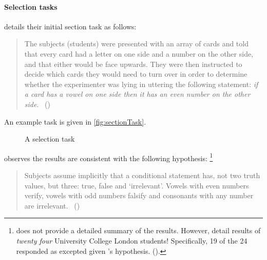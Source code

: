 \paragraph*{Selection tasks}
\nocite{Wason:1968aa}
\nocite{Wason:1971aa}
\label{par:selection-tasks}


\begin{note}
  \citeauthor{Wason:1966aa} details their initial section task as follows:

  \begin{quote}
    The subjects (students) were presented with an array of cards and told that every card had a letter on one side and a number on the other side, and that either would be face upwards.
    They were then instructed to decide which cards they would need to turn over in order to determine whether the experimenter was lying in uttering the following statement:
    \emph{if a card has a vowel on one side then it has an even number on the other side}.%
    \mbox{ }\hfill\mbox{(\citeyear[145--146]{Wason:1966aa})}
  \end{quote}

  An example task is given in \autoref{fig:sectionTask}.

  \begin{figure}[H]
    \centering
    \caption{A selection task}
    \label{fig:sectionTask}
  \end{figure}

  \citeauthor{Wason:1966aa} observes the results are consistent with the following hypothesis:%
  \footnote{
    \citeauthor{Wason:1966aa} does not provide a detailed summary of the results.
    However, \citeauthor{Johnson-Laird:1969aa} detail results of \emph{twenty four} University College London students!
    Specifically, 19 of the 24 responded as excepted given \citeauthor{Wason:1966aa}'s hypothesis.
    (\citeyear[369--370]{Johnson-Laird:1969aa}).
  }
  \begin{quote}
    Subjects assume implicitly that a conditional statement has, not two truth values, but three: true, false and `irrelevant'.
    Vowels with even numbers verify, vowels with odd numbers falsify and consonants with any number are irrelevant.%
    \mbox{ }\hfill\mbox{(\citeyear[146]{Wason:1966aa})}
  \end{quote}
\end{note}

